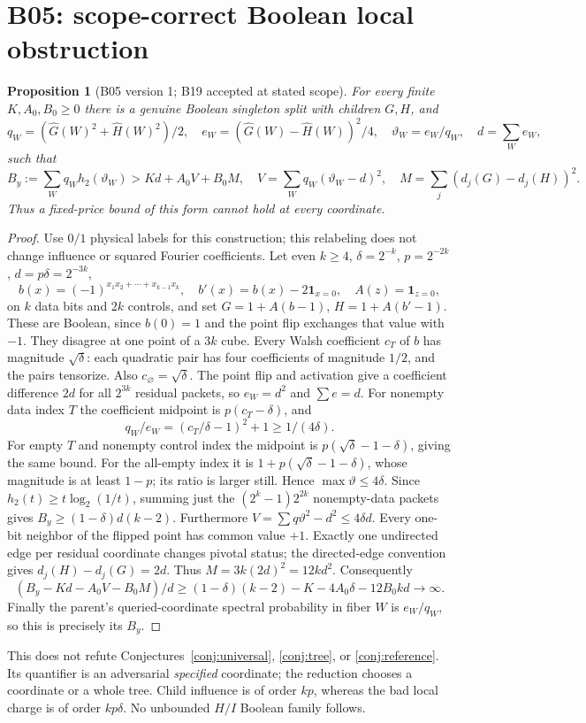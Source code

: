 \documentclass[11pt]{article}
\newtheorem{proposition}[lemma]{Proposition}
\begin{document}
\section{B05: scope-correct Boolean local obstruction}\label{sec:b05}
\begin{proposition}[B05 version 1; B19 accepted at stated scope]
\label{prop:b05}
For every finite $K,A_0,B_0\ge0$ there is a genuine Boolean
singleton split with children $G,H$, and
\[
q_W=(\widehat G(W)^2+\widehat H(W)^2)/2,\quad
e_W=(\widehat G(W)-\widehat H(W))^2/4,\quad
\vartheta_W=e_W/q_W,\quad d=\sum_We_W,
\]
such that
\[
B_y:=\sum_Wq_Wh_2(\vartheta_W)>Kd+A_0V+B_0M,\quad
V=\sum_Wq_W(\vartheta_W-d)^2,\quad
M=\sum_j(d_j(G)-d_j(H))^2.
\]
Thus a fixed-price bound of this form cannot hold at every coordinate.
\end{proposition}
\begin{proof}
Use $0/1$ physical labels for this construction; this relabeling
does not change influence or squared Fourier coefficients.
Let even $k\ge4$, $\delta=2^{-k}$, $p=2^{-2k}$,
$d=p\delta=2^{-3k}$,
\[
b(x)=(-1)^{x_1x_2+\cdots+x_{k-1}x_k},\quad
b'(x)=b(x)-2\mathbf1_{x=0},\quad A(z)=\mathbf1_{z=0},
\]
on $k$ data bits and $2k$ controls, and set
$G=1+A(b-1)$, $H=1+A(b'-1)$.
These are Boolean, since $b(0)=1$ and the point flip exchanges
that value with $-1$. They disagree at one point of a $3k$ cube.
Every Walsh coefficient $c_T$ of $b$ has magnitude $\sqrt\delta$:
each quadratic pair has four coefficients of magnitude $1/2$,
and the pairs tensorize. Also $c_\varnothing=\sqrt\delta$.
The point flip and activation give a coefficient difference $2d$
for all $2^{3k}$ residual packets, so $e_W=d^2$ and $\sum e=d$.
For nonempty data index $T$ the coefficient midpoint is
$p(c_T-\delta)$, and
\[
q_W/e_W=(c_T/\delta-1)^2+1\ge1/(4\delta).
\]
For empty $T$ and nonempty control index the midpoint is
$p(\sqrt\delta-1-\delta)$, giving the same bound.
For the all-empty index it is $1+p(\sqrt\delta-1-\delta)$,
whose magnitude is at least $1-p$; its ratio is larger still.
Hence $\max\vartheta\le4\delta$.
Since $h_2(t)\ge t\log_2(1/t)$, summing just the
$(2^k-1)2^{2k}$ nonempty-data packets gives
$B_y\ge(1-\delta)d(k-2)$.
Furthermore $V=\sum q\vartheta^2-d^2\le4\delta d$.
Every one-bit neighbor of the flipped point has common value $+1$.
Exactly one undirected edge per residual coordinate changes pivotal
status; the directed-edge convention gives $d_j(H)-d_j(G)=2d$.
Thus $M=3k(2d)^2=12kd^2$.
Consequently
\[
(B_y-Kd-A_0V-B_0M)/d
\ge(1-\delta)(k-2)-K-4A_0\delta-12B_0kd\longrightarrow\infty.
\]
Finally the parent's queried-coordinate spectral probability in
fiber $W$ is $e_W/q_W$, so this is precisely its $B_y$.
\end{proof}
This does not refute Conjectures~\ref{conj:universal},
\ref{conj:tree}, or \ref{conj:reference}. Its quantifier is an
adversarial \emph{specified} coordinate; the reduction chooses a
coordinate or a whole tree. Child influence is of order $kp$,
whereas the bad local charge is of order $kp\delta$.
No unbounded $H/I$ Boolean family follows.
\end{document}
